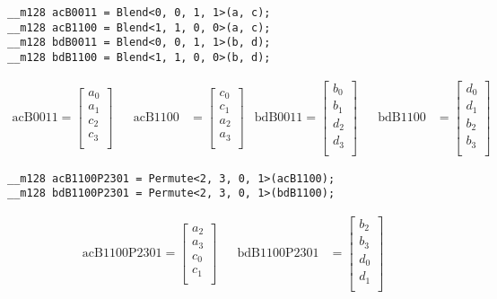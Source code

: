 \begin{verbatim}
__m128 acB0011 = Blend<0, 0, 1, 1>(a, c);
__m128 acB1100 = Blend<1, 1, 0, 0>(a, c);
__m128 bdB0011 = Blend<0, 0, 1, 1>(b, d);
__m128 bdB1100 = Blend<1, 1, 0, 0>(b, d);
\end{verbatim}

\begin{align*}
\mathrm{acB0011} 
=
\begin{bmatrix}
a_0\\
a_1\\
c_2\\
c_3\\
\end{bmatrix}
&&
\mathrm{acB1100} 
&=
\begin{bmatrix}
c_0\\
c_1\\
a_2\\
a_3\\
\end{bmatrix}
&
\mathrm{bdB0011} 
=
\begin{bmatrix}
b_0\\
b_1\\
d_2\\
d_3\\
\end{bmatrix}
&&
\mathrm{bdB1100} 
&=
\begin{bmatrix}
d_0\\
d_1\\
b_2\\
b_3\\
\end{bmatrix}
\end{align*}

\begin{verbatim}
__m128 acB1100P2301 = Permute<2, 3, 0, 1>(acB1100);
__m128 bdB1100P2301 = Permute<2, 3, 0, 1>(bdB1100);
\end{verbatim}

\begin{align*}
\mathrm{acB1100P2301} 
=
\begin{bmatrix}
a_2\\
a_3\\
c_0\\
c_1\\
\end{bmatrix}
&&
\mathrm{bdB1100P2301} 
&=
\begin{bmatrix}
b_2\\
b_3\\
d_0\\
d_1\\
\end{bmatrix}
\end{align*}


